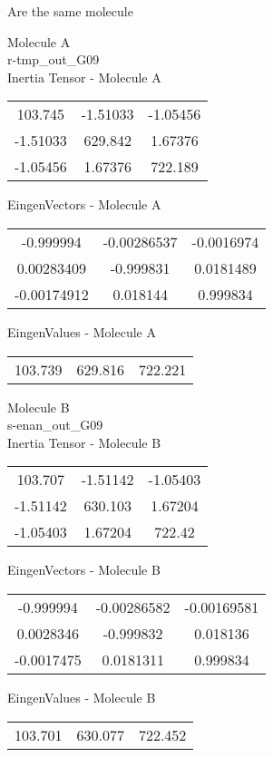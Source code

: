 \begin{center}
\vtab
\vtab
\textcolor{NavyBlue}{\Large Are the same molecule}
\end{center}
\newpage
\begin{multicols}{2}
\begin{center}
Molecule A \\ 
r-tmp\_out\_G09
\\
Inertia Tensor - Molecule A \\
\vtab
\begin{tabular}{|c c c|}
103.745	 & 	-1.51033	 & 	-1.05456	 \\
-1.51033	 & 	629.842	 & 	1.67376	 \\
-1.05456	 & 	1.67376	 & 	722.189
\end{tabular}

\vtab
 EingenVectors - Molecule A     \\
\vtab
\begin{tabular}{|c c c|}
-0.999994	 & 	-0.00286537	 & 	-0.0016974	 \\
0.00283409	 & 	-0.999831	 & 	0.0181489	 \\
-0.00174912	 & 	0.018144	 & 	0.999834
\end{tabular}

\vtab
 EingenValues - Molecule A     \\
\vtab
\begin{tabular}{|c c c|}
103.739	 & 	629.816	 & 	722.221
\end{tabular}
\columnbreak

Molecule B \\ 
s-enan\_out\_G09
\\
Inertia Tensor - Molecule B \\
\vtab
\begin{tabular}{|c c c|}
103.707	 & 	-1.51142	 & 	-1.05403	 \\
-1.51142	 & 	630.103	 & 	1.67204	 \\
-1.05403	 & 	1.67204	 & 	722.42
\end{tabular}

\vtab
 EingenVectors - Molecule B     \\
\vtab
\begin{tabular}{|c c c|}
-0.999994	 & 	-0.00286582	 & 	-0.00169581	 \\
0.0028346	 & 	-0.999832	 & 	0.018136	 \\
-0.0017475	 & 	0.0181311	 & 	0.999834
\end{tabular}

\vtab
 EingenValues - Molecule B     \\
\vtab
\begin{tabular}{|c c c|}
103.701	 & 	630.077	 & 	722.452
\end{tabular}

\end{center}
\end{multicols}
